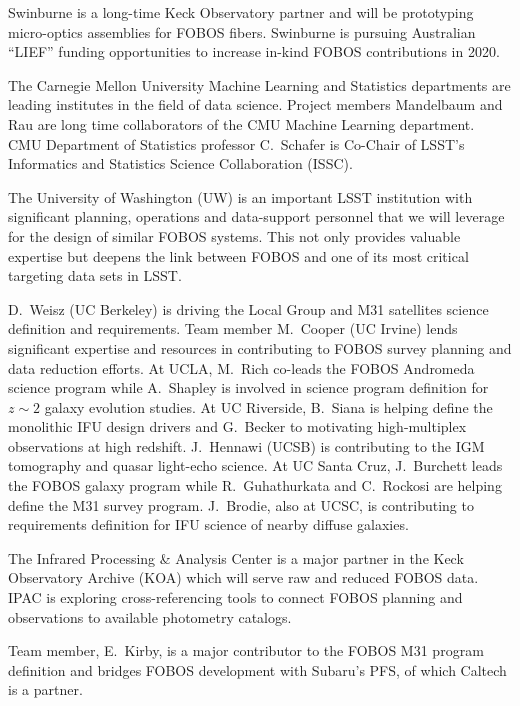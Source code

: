\documentclass[oneside,11pt]{amsart}
\begin{document}
 Swinburne is a long-time Keck Observatory partner and will be prototyping micro-optics assemblies for FOBOS fibers.  Swinburne is pursuing Australian ``LIEF'' funding opportunities to increase in-kind FOBOS contributions in 2020.


 The Carnegie Mellon University Machine Learning and Statistics
departments are leading institutes in the field of data science.  Project members Mandelbaum and Rau are long time
collaborators of the CMU Machine Learning department.  CMU Department of Statistics professor C.~Schafer is Co-Chair of
LSST's Informatics and Statistics Science Collaboration (ISSC).


 The University of Washington (UW) is an important LSST institution with significant planning, operations and data-support personnel that we will leverage for the design of similar FOBOS systems.  This not only provides valuable expertise but deepens the link between FOBOS and one of its most critical targeting data sets in LSST.


 D.~Weisz (UC Berkeley) is driving the Local Group and M31 satellites science definition and requirements.  Team member M.~Cooper (UC Irvine) lends significant expertise and resources in contributing to FOBOS survey planning and data reduction efforts.  At UCLA, M.~Rich co-leads the FOBOS Andromeda science program while A.~Shapley is involved in science program definition for $z \sim 2$ galaxy evolution studies.  At UC Riverside, B.~Siana is helping define the monolithic IFU design drivers and G.~Becker to motivating high-multiplex observations at high redshift.  J.~Hennawi (UCSB) is contributing to the IGM tomography and quasar light-echo science.  At UC Santa Cruz, J.~Burchett leads the FOBOS galaxy program while R.~Guhathurkata and C.~Rockosi are helping define the M31 survey program.  J.~Brodie, also at UCSC, is contributing to requirements definition for IFU science of nearby diffuse galaxies.

 The Infrared Processing \& Analysis Center is a major partner in the Keck Observatory Archive (KOA) which will serve raw and reduced FOBOS data.  IPAC is exploring cross-referencing tools to connect FOBOS planning and observations to available photometry catalogs.

 Team member, E.~Kirby, is a major contributor to the FOBOS M31 program definition and bridges FOBOS development with Subaru's PFS, of which Caltech is a partner.
\end{document}
